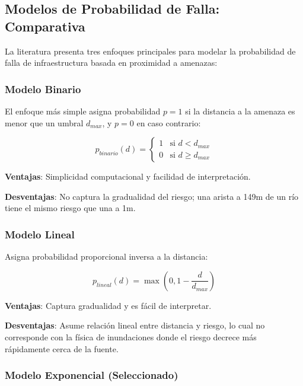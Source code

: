 \documentclass[conference]{IEEEtran}
\begin{document}
\subsection{Modelos de Probabilidad de Falla: Comparativa}

La literatura presenta tres enfoques principales para modelar la probabilidad de falla de infraestructura basada en proximidad a amenazas:

\subsubsection{Modelo Binario}

El enfoque más simple asigna probabilidad $p=1$ si la distancia a la amenaza es menor que un umbral $d_{max}$, y $p=0$ en caso contrario:

\begin{equation}
p_{binario}(d) = \begin{cases} 1 & \text{si } d < d_{max} \\ 0 & \text{si } d \geq d_{max} \end{cases}
\end{equation}

\textbf{Ventajas}: Simplicidad computacional y facilidad de interpretación.

\textbf{Desventajas}: No captura la gradualidad del riesgo; una arista a 149m de un río tiene el mismo riesgo que una a 1m.

\subsubsection{Modelo Lineal}

Asigna probabilidad proporcional inversa a la distancia:

\begin{equation}
p_{lineal}(d) = \max\left(0, 1 - \frac{d}{d_{max}}\right)
\end{equation}

\textbf{Ventajas}: Captura gradualidad y es fácil de interpretar.

\textbf{Desventajas}: Asume relación lineal entre distancia y riesgo, lo cual no corresponde con la física de inundaciones donde el riesgo decrece más rápidamente cerca de la fuente.

\subsubsection{Modelo Exponencial (Seleccionado)}
\end{document}
